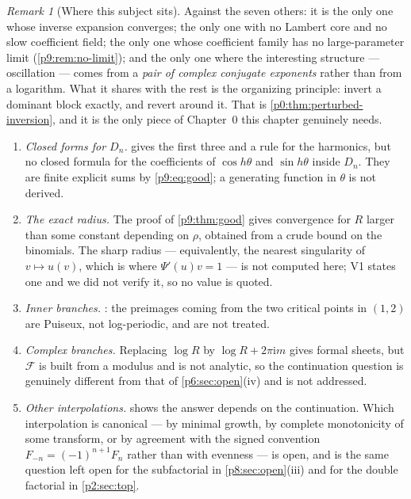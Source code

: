 \documentclass[11pt,a4paper,oneside]{book}
\theoremstyle{plain}
\theoremstyle{definition}
\theoremstyle{remark}
\newtheorem{remark}[theorem]{Remark}
\newcommand{\ii}{\mathrm{i}}
\begin{document}
\begin{remark}[Where this subject sits]\label{p9:rem:comparison}
Against the seven others: it is the only one whose inverse expansion
converges; the only one with no Lambert core and no slow coefficient field;
the only one whose coefficient family has no large-parameter limit
(\cref{p9:rem:no-limit}); and the only one where the interesting structure ---
oscillation --- comes from a \emph{pair of complex conjugate exponents} rather
than from a logarithm.  What it shares with the rest is the organizing
principle: invert a dominant block exactly, and revert around it.  That is
\cref{p0:thm:perturbed-inversion}, and it is the only piece of Chapter~0 this
chapter genuinely needs.
\end{remark}

\begin{enumerate}
\item \emph{Closed forms for $D_n$.}   gives the
first three and a rule for the harmonics, but no closed formula for the
coefficients of $\cos h\theta$ and $\sin h\theta$ inside $D_n$.  They are
finite explicit sums by \eqref{p9:eq:good}; a generating function in
$\theta$ is not derived.
\item \emph{The exact radius.}  The proof of \cref{p9:thm:good} gives
convergence for $R$ larger than some constant depending on $\rho$, obtained
from a crude bound on the binomials.  The sharp radius --- equivalently, the
nearest singularity of $v\mapsto u(v)$, which is where
$\Psi'(u)v=1$ --- is not computed here; V1 states one and we did not verify
it, so no value is quoted.
\item \emph{Inner branches.}  : the preimages coming from
the two critical points in $(1,2)$ are Puiseux, not log-periodic, and are not
treated.
\item \emph{Complex branches.}  Replacing $\log R$ by $\log R+2\pi\ii m$ gives
formal sheets, but $\mathcal{F}$ is built from a modulus and is not analytic,
so the continuation question is genuinely different from that of
\cref{p6:sec:open}(iv) and is not addressed.
\item \emph{Other interpolations.}   shows the answer
depends on the continuation.  Which interpolation is canonical --- by minimal
growth, by complete monotonicity of some transform, or by agreement with the
signed convention $F_{-n}=(-1)^{n+1}F_n$ rather than with evenness --- is
open, and is the same question left open for the subfactorial in
\cref{p8:sec:open}(iii) and for the double factorial in \cref{p2:sec:top}.
\end{enumerate}
\end{document}
